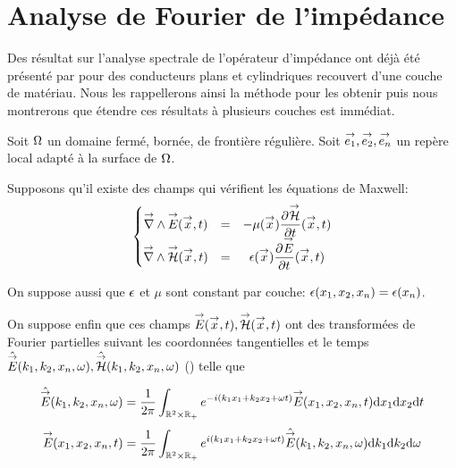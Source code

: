 \section{Analyse de Fourier de l'impédance}

Des résultat sur l'analyse spectrale de l'opérateur d'impédance ont déjà été présenté par \cite{hoppe_impedance_1995} pour des conducteurs plans et cylindriques recouvert d'une couche de matériau.
Nous les rappellerons ainsi la méthode pour les obtenir puis nous montrerons que étendre ces résultats à plusieurs couches est immédiat. 


Soit \(\Omega\) un domaine fermé, bornée, de frontière régulière. Soit \({\overset{\rightarrow}{e_1}},{\overset{\rightarrow}{e_2}},{\overset{\rightarrow}{e_n}}\) un repère local adapté à la surface de \(\Omega\).

Supposons qu'il existe des champs  qui vérifient les équations de Maxwell:
\begin{equation}
    \left\lbrace
    \begin{matrix}
    {\overset{\rightarrow}{\nabla}}\wedge {\overset{\rightarrow}{E}}({\overset{\rightarrow}{x}},t) &=& -\mu({\overset{\rightarrow}{x}}) \dfrac{\partial^{{}} {\overset{\rightarrow}{\mathcal{H}}}}{{\partial t}^{{}}}({\overset{\rightarrow}{x}},t) \\
    {\overset{\rightarrow}{\nabla}}\wedge {\overset{\rightarrow}{\mathcal{H}}}({\overset{\rightarrow}{x}},t) &=& \epsilon({\overset{\rightarrow}{x}}) \dfrac{\partial^{{}} {\overset{\rightarrow}{E}}}{{\partial t}^{{}}}({\overset{\rightarrow}{x}},t)
    \end{matrix}
    \right.
\end{equation}

On suppose aussi que \(\epsilon\) et \(\mu\) sont constant par couche: \(\epsilon(x_1,x_2,x_n)=\epsilon(x_n)\).

On suppose enfin que ces champs \({\overset{\rightarrow}{E}}({\overset{\rightarrow}{x}},t),{\overset{\rightarrow}{\mathcal{H}}}({\overset{\rightarrow}{x}},t)\) ont des transformées de Fourier partielles suivant les coordonnées tangentielles et le temps \(\hat{{\overset{\rightarrow}{E}}}(k_1,k_2,x_n,\omega), \hat{{\overset{\rightarrow}{\mathcal{H}}}}(k_1,k_2,x_n,\omega)\) (\cite[Théorème de Plancherel, p.~153]{yosida_functional_1995}) telle que

\begin{equation}
    \hat{{\overset{\rightarrow}{E}}} (k_1,k_2,x_n,\omega) = \dfrac{1}{2\pi}\int_{\mathbb R^2\times\mathbb R_+} e^{-i(k_1x_1+k_2x_2+\omega t)}{\overset{\rightarrow}{E}}(x_1,x_2,x_n,t) \mathrm{d}{x_1}\mathrm{d}{x_2}\mathrm{d}{t}
\end{equation}
\begin{equation}
    {\overset{\rightarrow}{E}}(x_1,x_2,x_n,t) = \dfrac{1}{2\pi}\int_{\mathbb R^2\times\mathbb R_+} e^{i(k_1x_1+k_2x_2+\omega t)}\hat{{\overset{\rightarrow}{E}}} (k_1,k_2,x_n,\omega) \mathrm{d}{k_1}\mathrm{d}{k_2} \mathrm{d}{\omega}
\end{equation}

